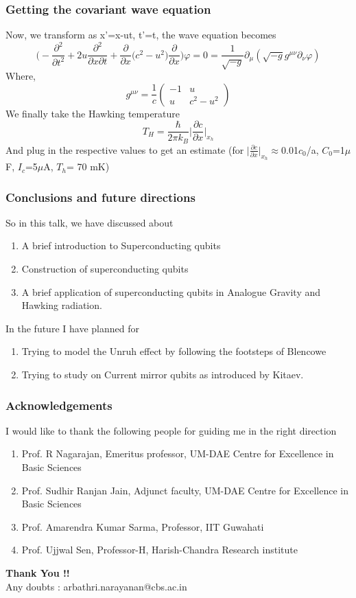 \documentclass[11pt]{beamer}
\begin{document}
		\begin{frame}
		\frametitle{Getting the covariant wave equation}
Now, we transform as x'=x-ut, t'=t, the wave equation becomes 
\[\bigg(-\frac{\partial^2}{\partial t^2}+2u\frac{\partial^2}{\partial x\partial t}+\frac{\partial}{\partial x}\big(c^2-u^2\big)\frac{\partial}{\partial x}\bigg)\varphi=0=\frac{1}{\sqrt{-g}}\partial_\mu(\sqrt{-g}g^{\mu\nu}\partial_\nu\varphi)\]
Where,
\[ g^{\mu\nu}=\frac{1}{c}
\begin{pmatrix}
	-1 & u \\
	u & c^2-u^2 
\end{pmatrix}
\]
We finally take the Hawking temperature
\[T_H=\frac{\hbar}{2\pi k_B}\bigg|\frac{\partial c}{\partial x}\bigg|_{x_h}\]
And plug in the respective values to get an estimate (for $\bigg|\frac{\partial c}{\partial x}\bigg|_{x_h}$$\approx$0.01$c_0$/a, $C_0$=1$\mu$ F, $I_c$=5$\mu$A, $T_h$= 70 mK)
 
	\end{frame}
	
		\begin{frame}
		\frametitle{Conclusions and future directions}
		So in this talk, we have discussed about
		\begin{enumerate}
			\item A brief introduction to Superconducting qubits
			\item  Construction of superconducting qubits
			\item  A brief application of superconducting qubits in Analogue Gravity and Hawking radiation.
			\end{enumerate}
			
			In the future I have planned for
			\begin{enumerate}
				\item Trying to model the Unruh effect by following the footsteps of Blencowe
				\item Trying to study on Current mirror qubits as introduced by Kitaev.
			\end{enumerate}
	\end{frame}
	
			\begin{frame}
		\frametitle{Acknowledgements}
		I would like to thank the following people for guiding me in the right direction
		\begin{enumerate}
			\item Prof. R Nagarajan, Emeritus professor, UM-DAE Centre for Excellence in Basic Sciences
			\item Prof. Sudhir Ranjan Jain, Adjunct faculty, UM-DAE Centre for Excellence in Basic Sciences
			\item  Prof. Amarendra Kumar Sarma, Professor, IIT Guwahati
			\item Prof. Ujjwal Sen, Professor-H, Harish-Chandra Research institute
		\end{enumerate}
	\end{frame}
	
	\begin{frame}
		\begin{center}
			\LARGE\textbf{Thank You !!} \\
			Any doubts : arbathri.narayanan@cbs.ac.in
		\end{center}
	
	\end{frame}
\end{document}
